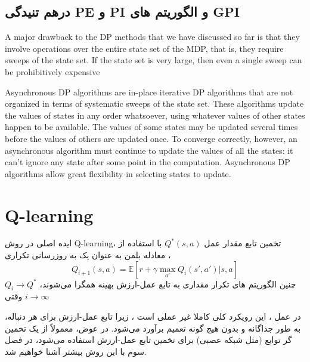 \subsection{درهم تنیدگی PE و PI و الگوریتم های GPI}


A major drawback to the DP methods that we have discussed so far is that they involve operations
over the entire state set of the MDP, that is, they require sweeps of the state set. If the state set is very
large, then even a single sweep can be prohibitively expensive


Asynchronous DP algorithms are in-place iterative DP algorithms that are not organized in terms
of systematic sweeps of the state set. These algorithms update the values of states in any order
whatsoever, using whatever values of other states happen to be available. The values of some states
may be updated several times before the values of others are updated once. To converge correctly,
however, an asynchronous algorithm must continue to update the values of all the states: it can’t ignore
any state after some point in the computation. Asynchronous DP algorithms allow great flexibility in
selecting states to update.

\section{Q-learning}
ایده اصلی در روش Q-learning، تخمین تابع مقدار عمل  
$Q^*(s,a)$ 
با استفاده از معادله بلمن به عنوان یک به روزرسانی تکراری ،
$$Q_{i+1}(s,a) = \mathbb{E}[r+ \gamma \max_{a'} Q_i(s',a')|s,a]$$
چنین الگوریتم های تکرار مقداری به تابع عمل-ارزش بهینه همگرا می‌شوند، 
$Q_i \longrightarrow Q^*$
وقتی
$i \longrightarrow \infty$

در عمل ، این رویکرد کلی کاملا غیر عملی است ،
زیرا تابع عمل-ارزش برای هر دنباله، به طور جداگانه و بدون هیچ گونه تعمیم برآورد می‌شود. در عوض، معمولاً از یک تخمین گر توابع (مثل شبکه عصبی) برای تخمین تابع عمل-ارزش استفاده می‌شود، در فصل سوم با این روش بیشتر آشنا خواهیم شد.